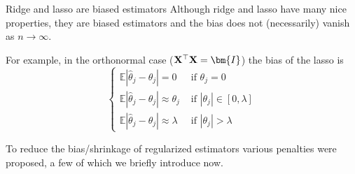 \documentclass[11pt,compress,t,notes=noshow, xcolor=table]{beamer}
\begin{document}

\begin{vbframe}{Ridge and lasso are biased estimators} 
Although ridge and lasso have many nice properties, they are biased estimators and the bias does not (necessarily) vanish as $n \rightarrow \infty$.\\
\vspace{0.3cm}

For example, in the orthonormal case ($\Xmat^{\top}\Xmat=\bm{I}$) the bias of the lasso is
$$
\begin{cases}\mathbb{E}\left|\widehat{\theta}_j-\theta_j\right|=0 & \text { if } \theta_j=0 \\ \mathbb{E}\left|\widehat{\theta}_j-\theta_j\right| \approx \theta_j & \text { if }\left|\theta_j\right| \in[0, \lambda] \\ \mathbb{E}\left|\widehat{\theta}_j-\theta_j\right| \approx \lambda & \text { if }\left|\theta_j\right|>\lambda\end{cases}
$$
\vspace{0.3cm}

\vspace{0.2cm}
To reduce the bias/shrinkage of regularized estimators various penalties were proposed, a few of which we briefly introduce now.

\end{vbframe}
\end{document}
